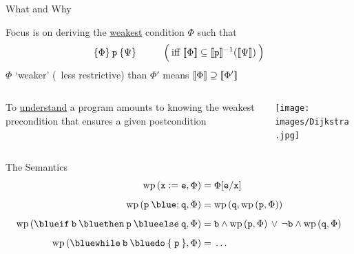 \documentclass{beamer}
\begin{document}
\begin{frame}{What and Why}

        Focus is on deriving the \alert{\underline{weakest}} condition $\Phi$ such that
        \[
                \{ \Phi \} \> \mathtt{p} \> \{ \Psi \}   \hspace{1cm}
                \Big ( \> \text{iff } \llbracket \Phi \rrbracket \subseteq \llbracket \mathtt{p} \rrbracket^{-1}(\llbracket \Psi \rrbracket) \> \Big )
        \]
        \pause
        $\Phi$ `weaker' (\ie\ less restrictive) than $\Phi'$ means $\llbracket \Phi \rrbracket \supseteq \llbracket \Phi' \rrbracket$

        \pause
        \bigskip
        \bigskip
        \begin{minipage}[0.3\textheight]{\textwidth}
                \begin{columns}[c]
                \begin{column}{0.7\textwidth}
                        To \alert{\underline{understand}} a program amounts to knowing the weakest
                        precondition that ensures a given postcondition
                \end{column}
                \begin{column}{0.22\textwidth}
                        \texttt{[image: images/Dijkstra.jpg]}
                \end{column}
                \end{columns}
       \end{minipage}
\end{frame}

\begin{frame}{The Semantics}
        \begin{align*}
                \mathrm{wp}\,(\prog{x : = e}, \Phi) & = \Phi[\prog{e}/\prog{x}] \\[5pt]
                \mathrm{wp}\,(\prog{p} \> {\blue ;} \> \prog{q}, \Phi) & 
                = \mathrm{wp} \, (\prog{q}, \mathrm{wp} \, (\prog{p}, \Phi))  \\[5pt]
                \mathrm{wp}\,({\mathtt{{\blue if} \> b \> {\blue then} \> p \> {\blue else} \> q}}, \Phi)
                & 
                =
                \prog{b} \wedge \mathrm{wp}\, (\prog{p},\Phi) \, \vee \,
                \prog{\neg b} \wedge \mathrm{wp} \, (\prog{q}, \Phi)
                \\[5pt]
                \mathrm{wp} \, ({\mathtt{{\blue while} \> b \> {\blue do} \> \{ \> p \> \}} }, \Phi)
                & = \, \dots 
        \end{align*}
\end{frame}
\end{document}
